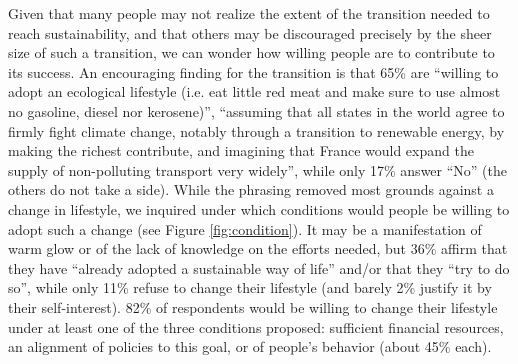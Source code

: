 \documentclass[english,5p,authoryear]{elsarticle}
\begin{document}
Given that many people may not realize the extent of the transition needed to reach sustainability, and that others may be discouraged precisely by the sheer size of such a transition, we can wonder how willing people are to contribute to its success. An encouraging finding for the transition is that 65\% are ``willing to adopt an ecological lifestyle (i.e. eat little red meat and make sure to use almost no gasoline, diesel nor kerosene)'', ``assuming that all states in the world agree to firmly fight climate change, notably through a transition to renewable energy, by making the richest contribute, and imagining that France would expand the supply of non-polluting transport very widely'', while only 17\% answer ``No'' (the others do not take a side). While the phrasing removed most grounds against a change in lifestyle, we inquired under which conditions would people be willing to adopt such a change (see Figure \ref{fig:condition}). It may be a manifestation of warm glow or of the lack of knowledge on the efforts needed, but 36\% affirm that they have ``already adopted a sustainable way of life'' and/or that they ``try to do so'', while only 11\% refuse to change their lifestyle (and barely 2\% justify it by their self-interest). 82\% of respondents would be willing to change their lifestyle under at least one of the three conditions proposed: sufficient financial resources, an alignment of policies to this goal, or of people's behavior (about 45\% each).
\end{document}
